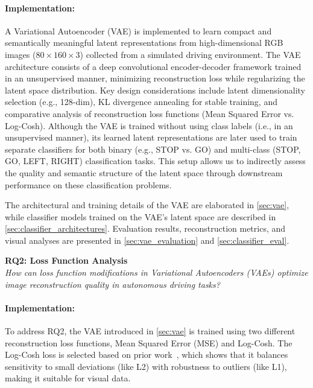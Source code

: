 \paragraph{Implementation:} A Variational Autoencoder (VAE) is implemented to learn compact and semantically meaningful latent representations from high-dimensional RGB images (\(80 \times 160 \times 3\)) collected from a simulated driving environment. The VAE architecture consists of a deep convolutional encoder-decoder framework trained in an unsupervised manner, minimizing reconstruction loss while regularizing the latent space distribution. Key design considerations include latent dimensionality selection (e.g., 128-dim), KL divergence annealing for stable training, and comparative analysis of reconstruction loss functions (Mean Squared Error vs. Log-Cosh). Although the VAE is trained without using class labels (i.e., in an unsupervised manner), its learned latent representations are later used to train separate classifiers for both binary (e.g., STOP vs. GO) and multi-class (STOP, GO, LEFT, RIGHT) classification tasks. This setup allows us to indirectly assess the quality and semantic structure of the latent space through downstream performance on these classification problems.


The architectural and training details of the VAE are elaborated in \cref{sec:vae}, while classifier models trained on the VAE’s latent space are described in \cref{sec:classifier_architectures}. Evaluation results, reconstruction metrics, and visual analyses are presented in \cref{sec:vae_evaluation} and \cref{sec:classifier_eval}.

\vspace{1em}

\textbf{RQ2: Loss Function Analysis} \\
\textit{How can loss function modifications in Variational Autoencoders (VAEs) optimize image reconstruction quality in autonomous driving tasks?}

\vspace{-1em}

\paragraph{Implementation:} To address RQ2, the VAE introduced in \cref{sec:vae} is trained using two different reconstruction loss functions, Mean Squared Error (MSE) and Log-Cosh. The Log-Cosh loss is selected based on prior work~\cite{chen2019log}, which shows that it balances sensitivity to small deviations (like L2) with robustness to outliers (like L1), making it suitable for visual data.
        
